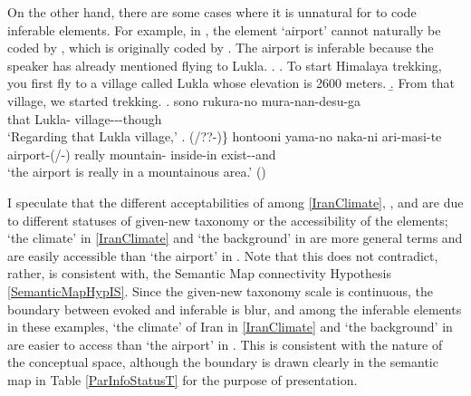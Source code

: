 On the other hand,
there are some cases where it is unnatural for  to code inferable elements.
For example, in \Next[c],
the element  `airport' cannot naturally be coded by ,
which is originally coded by .
The airport is inferable because the speaker has already mentioned flying to Lukla.
\ex.
%
	\a. To start Himalaya trekking, you first fly to a village called Lukla whose elevation is 2600 meters.
	\b. From that village, we started trekking.
	\bg. sono rukura-no mura-nan-desu-ga \\
		that Lukla- village---though \\
		`Regarding that Lukla village,'
	\bg. (/??-)\} hontooni yama-no naka-ni ari-masi-te \\
		airport-(/-) really mountain- inside-in exist--and \\
		`the airport is really in a mountainous area.'
	\hfill{()}

I speculate that the different acceptabilities of  among \ref{IranClimate}, \LLast, and \Last are due to different statuses of given-new taxonomy or the accessibility of the elements;
`the climate' in \ref{IranClimate} and `the background' in \LLast are more general terms and are easily accessible
than `the airport' in \Last.
Note that this does not contradict, rather, is consistent with, the Semantic Map connectivity Hypothesis \ref{SemanticMapHypIS}.
Since the given-new taxonomy scale is continuous,
the boundary between evoked and inferable is blur, and
among the inferable elements in these examples,
`the climate' of Iran in \ref{IranClimate} and `the background' in \LLast are easier to access than `the airport' in \Last.
This is consistent with the nature of the conceptual space,
although the boundary is drawn clearly in the semantic map in Table \ref{ParInfoStatusT}
for the purpose of presentation.

